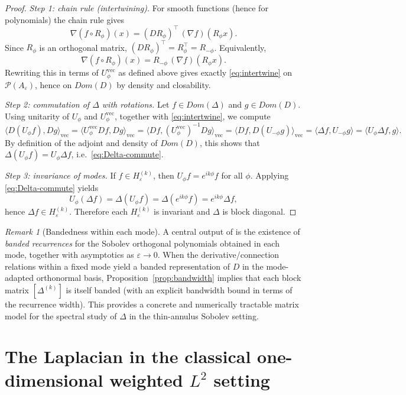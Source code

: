 \documentclass{amsart}
\numberwithin{equation}{section}
\theoremstyle{definition}
\theoremstyle{remark}
\newtheorem{remark}[theorem]{Remark}
\begin{document}
\begin{proof}
\emph{Step 1: chain rule (intertwining).}
For smooth functions (hence for polynomials) the chain rule gives
\[
\nabla(f\circ R_\phi)(x) = (DR_\phi)^{\!\top}\,(\nabla f)(R_\phi x).
\]
Since $R_\phi$ is an orthogonal matrix, $(DR_\phi)^{\!\top}=R_\phi^{\top}=R_{-\phi}$.
Equivalently,
\[
\nabla(f\circ R_\phi)(x) = R_{-\phi}\,(\nabla f)(R_\phi x).
\]
Rewriting this in terms of $U_\phi^{\mathrm{vec}}$ as defined above gives exactly
\eqref{eq:intertwine} on $\mathcal P(A_\varepsilon)$, hence on $Dom(D)$ by density
and closability.

\emph{Step 2: commutation of $\Delta$ with rotations.}
Let $f\in Dom(\Delta)$ and $g\in Dom(D)$. Using unitarity of $U_\phi$ and $U_\phi^{\mathrm{vec}}$,
together with \eqref{eq:intertwine}, we compute
\[
\langle D(U_\phi f), Dg\rangle_{\mathrm{vec}}
=
\langle U_\phi^{\mathrm{vec}}Df, Dg\rangle_{\mathrm{vec}}
=
\langle Df, (U_\phi^{\mathrm{vec}})^{-1}Dg\rangle_{\mathrm{vec}}
=
\langle Df, D(U_{-\phi}g)\rangle_{\mathrm{vec}}
=
\langle \Delta f, U_{-\phi}g\rangle
=
\langle U_\phi \Delta f, g\rangle.
\]
By definition of the adjoint and density of $Dom(D)$, this shows that
$\Delta(U_\phi f)=U_\phi\Delta f$, i.e.\ \eqref{eq:Delta-commute}.

\emph{Step 3: invariance of modes.}
If $f\in H_\varepsilon^{(k)}$, then $U_\phi f = e^{ik\phi}f$ for all $\phi$.
Applying \eqref{eq:Delta-commute} yields
\[
U_\phi(\Delta f) = \Delta(U_\phi f) = \Delta(e^{ik\phi}f) = e^{ik\phi}\Delta f,
\]
hence $\Delta f\in H_\varepsilon^{(k)}$.
Therefore each $H_\varepsilon^{(k)}$ is invariant and $\Delta$ is block diagonal.
\end{proof}


\begin{remark}[Bandedness within each mode]
A central output of \cite{MagnotThinAnnuli} is the existence of \emph{banded recurrences} for the Sobolev
orthogonal polynomials obtained in each mode, together with asymptotics as $\varepsilon\to 0$.
When the derivative/connection relations within a fixed mode yield a banded representation of $D$ in the
mode-adapted orthonormal basis, Proposition~\ref{prop:bandwidth} implies that each block matrix
$[\Delta^{(k)}]$ is itself banded (with an explicit bandwidth bound in terms of the recurrence width).
This provides a concrete and numerically tractable matrix model for the spectral study of $\Delta$ in the thin-annulus
Sobolev setting.
\end{remark}


\section{The Laplacian in the classical one-dimensional weighted $L^2$ setting}
\label{sec:laplacian-1d-measure}
\end{document}

